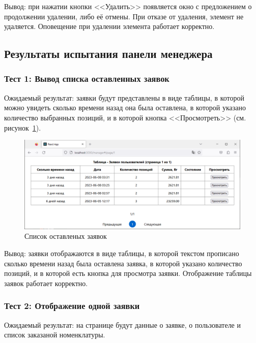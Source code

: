 Вывод: при нажатии кнопки <<Удалить>> появляется окно с предложением о продолжении удалении, либо её отмены.
При отказе от удаления, элемент не удаляется. Оповещение при удалении элемента работает корректно.

\subsection{Результаты испытания панели менеджера}

\subsubsection*{Тест 1: Вывод списка оставленных заявок}

Ожидаемый результат: заявки будут представлены в виде таблицы,
в которой можно увидеть сколько времени назад она была оставлена,
в которой указано количество выбранных позиций,
и в которой кнопка <<Просмотреть>> (см. рисунок~\ref{fig:test_manager_orders_view}).

\begin{figure}[!htb]\centering

    \includegraphics[width=18cm]
    {images/mobile/manager/tests/orders_view.png}

    \caption{Список оставленых заявок}
    \label{fig:test_manager_orders_view}
\end{figure}

Вывод: заявки отображаются в виде таблицы,
в которой текстом прописано сколько времени назад была оставлена заявка,
в которой указано количество позиций,
и в которой есть кнопка для просмотра заявки.
Отображение таблицы заявок работает корректно.

\subsubsection*{Тест 2: Отображение одной заявки}

Ожидаемый результат: на странице будут данные о заявке, о пользователе и список заказаной номенклатуры.

